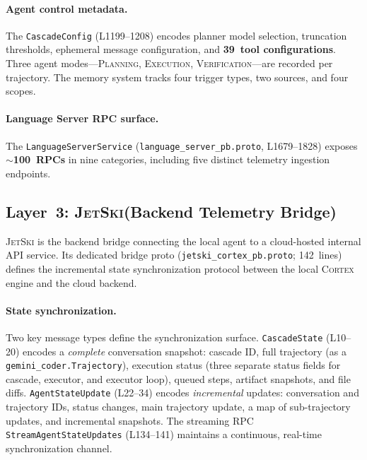 \documentclass[sigconf,anonymous]{acmart}
\newcommand{\cortex}{\textsc{Cortex}\xspace}
\newcommand{\jetski}{\textsc{JetSki}\xspace}
\begin{document}
\paragraph{Agent control metadata.}
The \texttt{CascadeConfig} (L1199--1208) encodes planner model
selection, truncation thresholds, ephemeral message configuration,
and \textbf{39~tool configurations}.  Three agent
modes---\textsc{Planning}, \textsc{Execution},
\textsc{Verification}---are recorded per trajectory.  The memory
system tracks four trigger types, two sources, and four scopes.

\paragraph{Language Server RPC surface.}
The \texttt{LanguageServerService}
(\texttt{language\_server\_pb.proto}, L1679--1828) exposes
$\sim$\textbf{100~RPCs} in nine categories, including five distinct
telemetry ingestion endpoints.


\subsection{Layer~3: \jetski (Backend Telemetry Bridge)}\label{sec:jetski}

\jetski is the backend bridge connecting the local agent to a
cloud-hosted internal API service.  Its dedicated bridge proto
(\texttt{jetski\_cortex\_pb.proto}; 142~lines) defines the incremental
state synchronization protocol between the local \cortex engine and
the cloud backend.

\paragraph{State synchronization.}
Two key message types define the synchronization surface.
\texttt{CascadeState} (L10--20) encodes a \emph{complete} conversation
snapshot: cascade ID, full trajectory (as a
\texttt{gemini\_coder.Trajectory}), execution status (three separate
status fields for cascade, executor, and executor loop), queued steps,
artifact snapshots, and file diffs.  \texttt{AgentStateUpdate}
(L22--34) encodes \emph{incremental} updates: conversation and
trajectory IDs, status changes, main trajectory update, a map of
sub-trajectory updates, and incremental snapshots.  The streaming RPC
\texttt{StreamAgentStateUpdates} (L134--141) maintains a continuous,
real-time synchronization channel.
\end{document}

